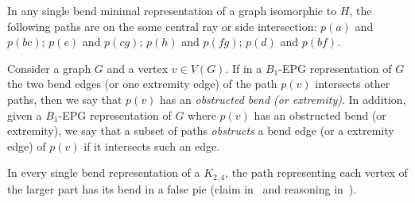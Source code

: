 \documentclass[runningheads]{llncs}
\begin{document}
\begin{corollary} \label{coro:paresMesmoSegmento}
In any single bend minimal representation of a graph isomorphic to $H$, the following paths are on the some central ray or side intersection: $p(a)$ and $p(bc)$; $p(e)$ and $p(cg)$; $p(h)$ and $p(fg)$; $p(d)$ and $p(bf)$.

\end{corollary}





\begin{definition}
Consider a graph $G$ and a vertex $v \in V(G)$. If in a $B_1$-EPG representation of $G$ the two bend edges (or one extremity edge) of the path $p(v)$ intersects other paths, then we say that $p(v)$ has an \emph{obstructed bend (or extremity)}. 
In addition, given a $B_1$-EPG representation of $G$ where $p(v)$ has an obstructed bend (or extremity), we say that a subset of paths \emph{obstructs} a bend edge (or a extremity edge) of $p(v)$ if it intersects such an edge. 
\end{definition}


\begin{remark} \label{fact:k24facts}
In every single bend representation of a $K_{2,4}$, the path representing each vertex of the larger part has its bend in a false pie (claim in~\cite{daniel2014b} and reasoning in~\cite{Asinowski2009}).
\end{remark} %



\end{document}
